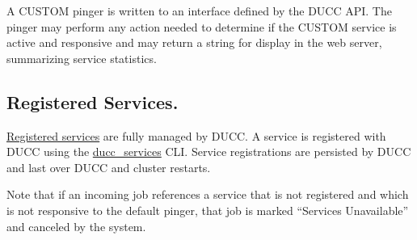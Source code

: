       A CUSTOM pinger is written to an interface defined by the DUCC API.  The pinger may perform
      any action needed to determine if the CUSTOM service is active and responsive and may return
      a string for display in the web server, summarizing service statistics.
            
      \subsection{Registered Services.} \hyperref[sec:cli.ducc-services]{Registered services} are
      fully managed by DUCC. A service is registered with DUCC using the
      \hyperref[sec:cli.ducc-services]{ducc\_services} CLI. Service registrations are persisted by
      DUCC and last over DUCC and cluster restarts.

      Note that if an incoming job references a service that is not registered and which is not
      responsive to the default pinger, that job is marked ``Services Unavailable'' and canceled
      by the system.


